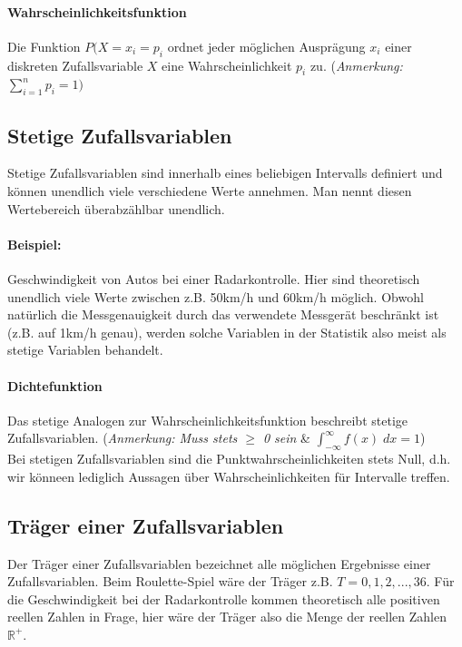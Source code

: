 \documentclass[a4paper]{article}
\newcommand{\R}{\mathbb{R}}
\newcommand\dangersign{%
 \makebox[1.8em][c]{%
 \makebox[0pt][c]{\raisebox{.15em}{\small!}}%
 \makebox[0pt][c]{\color{red}\Large$\triangle$}}}%
\begin{document}
\paragraph{Wahrscheinlichkeitsfunktion} Die Funktion $P(X = x_i= p_i$ ordnet jeder möglichen Ausprägung $x_i$ einer diskreten Zufallsvariable $X$ eine Wahrscheinlichkeit $p_i$ zu. (\textit{Anmerkung:} $\sum_{i=1}^n p_i = 1)$

\subsection{Stetige Zufallsvariablen} \label{sec:szv}
Stetige Zufallsvariablen sind innerhalb eines beliebigen Intervalls definiert und können unendlich viele verschiedene Werte annehmen. Man nennt diesen Wertebereich überabzählbar unendlich.

\paragraph{Beispiel:} Geschwindigkeit von Autos bei einer Radarkontrolle. Hier sind theoretisch unendlich viele Werte zwischen z.B. 50km/h und 60km/h möglich. Obwohl natürlich die Messgenauigkeit durch das verwendete Messgerät beschränkt ist (z.B. auf 1km/h genau), werden solche Variablen in der Statistik also meist als stetige Variablen behandelt.

\paragraph{Dichtefunktion} Das stetige Analogen zur Wahrscheinlichkeitsfunktion beschreibt stetige Zufallsvariablen. (\textit{Anmerkung: Muss stets $\geq$ 0 sein }\& $\int_{-\infty}^{\infty} f(x)\; dx = 1$)\\

\noindent \dangersign Bei stetigen Zufallsvariablen sind die Punktwahrscheinlichkeiten stets Null, d.h. wir könneen lediglich Aussagen über Wahrscheinlichkeiten für Intervalle treffen.

\subsection{Träger einer Zufallsvariablen} \label{sec:traeger}

Der Träger einer Zufallsvariablen bezeichnet alle möglichen Ergebnisse einer Zufallsvariablen. Beim Roulette-Spiel wäre der Träger z.B. $ T = 0,1,2,...,36$. Für die Geschwindigkeit bei der Radarkontrolle kommen theoretisch alle positiven reellen Zahlen in Frage, hier wäre der Träger also die Menge der reellen Zahlen $\R^+$.
\end{document}
